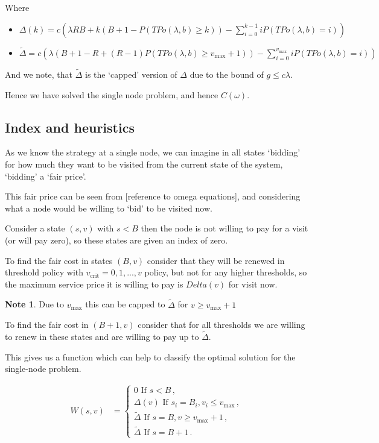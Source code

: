 \documentclass[a4paper,10pt]{article}
\theoremstyle{definition}
\theoremstyle{definition}
\theoremstyle{remark}
\theoremstyle{definition}
\newtheorem*{note}{Note}
\begin{document}
Where
\begin{itemize}
\item $\Delta(k)=c (\lambda R B +k(B+1-P(TPo(\lambda,b) \geq k))-\sum\limits_{i=0}^{k-1} i P(TPo(\lambda,b)=i))$
\item $\widetilde{\Delta}= c  ( \lambda (B+1-R + (R-1) P(TPo(\lambda,b) \geq v_{\text{max}}+1)) - \sum\limits_{i=0}^{v_{\text{max}}} i P(TPo(\lambda,b)=i) )$
\end{itemize}
And we note, that $\widetilde{\Delta}$ is the `capped' version of $\Delta$ due to the bound of $g \leq c \lambda$.

Hence we have solved the single node problem, and hence $C(\omega)$.

\subsection{Index and heuristics}
As we know the strategy at a single node, we can imagine in all states `bidding' for how much they want to be visited from the current state of the system, `bidding' a `fair price'.

This fair price can be seen from [reference to omega equations], and considering what a node would be willing to `bid' to be visited now.

Consider a state $(s,v)$ with $s< B$ then the node is not willing to pay for a visit (or will pay zero), so these states are given an index of zero.

To find the fair cost in states $(B,v)$ consider that they will be renewed in threshold policy with $v_{\text{crit}}=0,1,...,v$ policy, but not for any higher thresholds, so the maximum service price it is willing to pay is $Delta(v)$ for visit now.

\begin{note}
Due to $v_{\text{max}}$ this can be capped to $\widetilde{\Delta}$ for $v \geq v_{\text{max}}+1$
\end{note} 

To find the fair cost in $(B+1,v)$ consider that for all thresholds we are willing to renew  in these states and are willing to pay up to $\widetilde{\Delta}$.

This gives us a function which can help to classify the optimal solution for the single-node problem.

\begin{align*}
W(s,v)&=\begin{cases}
0 \text{ If } s<B \, , \\
\Delta(v) \text{ If } s_{i}=B_{i} , v_{i} \leq v_{\text{max}} \, , \\
\widetilde{\Delta} \text{ If } s=B , v \geq v_{\text{max}}+1 \, , \\
\widetilde{\Delta} \text{ If } s=B+1 \, .
\end{cases}
\end{align*}
\end{document}
